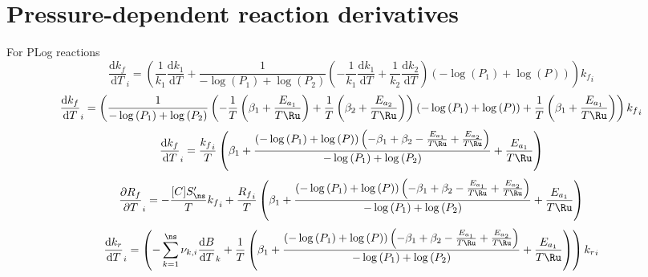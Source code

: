 \documentclass[a4paper,10pt]{article}
\begin{document}
\section{Pressure-dependent reaction derivatives}
For PLog reactions
\begin{dmath} \frac{\text{d} {k_f} }{\text{d} T }_{i} = \left(\frac{1}{k_{1}} \frac{\text{d} k_1 }{\text{d} T } + \frac{1}{- \log{\left (P_{1} \right )} + \log{\left (P_{2} \right )}} \left(- \frac{1}{k_{1}} \frac{\text{d} k_1 }{\text{d} T } + \frac{1}{k_{2}} \frac{\text{d} k_2 }{\text{d} T }\right) \left(- \log{\left (P_{1} \right )} + \log{\left (P \right )}\right)\right) {k_f}_{i}\end{dmath} 
\begin{dmath} \frac{\text{d} {k_f} }{\text{d} T }_{i} = \left(\frac{1}{- \log{\left (P_{1} \right )} + \log{\left (P_{2} \right )}} \left(- \frac{1}{T} \left(\beta_1 + \frac{E_{a_1}}{T \Ru}\right) + \frac{1}{T} \left(\beta_2 + \frac{E_{a_2}}{T \Ru}\right)\right) \left(- \log{\left (P_{1} \right )} + \log{\left (P \right )}\right) + \frac{1}{T} \left(\beta_1 + \frac{E_{a_1}}{T \Ru}\right)\right) {k_f}_{i}\end{dmath} 
\begin{dmath} \frac{\text{d} {k_f} }{\text{d} T }_{i} = \frac{{k_f}_{i}}{T} \left(\beta_1 + \frac{\left(- \log{\left (P_{1} \right )} + \log{\left (P \right )}\right) \left(- \beta_1 + \beta_2 - \frac{E_{a_1}}{T \Ru} + \frac{E_{a_2}}{T \Ru}\right)}{- \log{\left (P_{1} \right )} + \log{\left (P_{2} \right )}} + \frac{E_{a_1}}{T \Ru}\right)\end{dmath} 
\begin{dmath} \frac{\partial {R_f} }{\partial T }_{i} = - \frac{[C] S^{\prime}_{\ns}}{T} {k_f}_{i} + \frac{{R_f}_{i}}{T} \left(\beta_1 + \frac{\left(- \log{\left (P_{1} \right )} + \log{\left (P \right )}\right) \left(- \beta_1 + \beta_2 - \frac{E_{a_1}}{T \Ru} + \frac{E_{a_2}}{T \Ru}\right)}{- \log{\left (P_{1} \right )} + \log{\left (P_{2} \right )}} + \frac{E_{a_1}}{T \Ru}\right)\end{dmath} 
\begin{dmath} \frac{\text{d} {k_r} }{\text{d} T }_{i} = \left(- \sum_{k=1}^{\ns} \nu_{k,i} \frac{\text{d} B }{\text{d} T }_{k} + \frac{1}{T} \left(\beta_1 + \frac{\left(- \log{\left (P_{1} \right )} + \log{\left (P \right )}\right) \left(- \beta_1 + \beta_2 - \frac{E_{a_1}}{T \Ru} + \frac{E_{a_2}}{T \Ru}\right)}{- \log{\left (P_{1} \right )} + \log{\left (P_{2} \right )}} + \frac{E_{a_1}}{T \Ru}\right)\right) {k_r}_{i}\end{dmath} 
\end{document}
